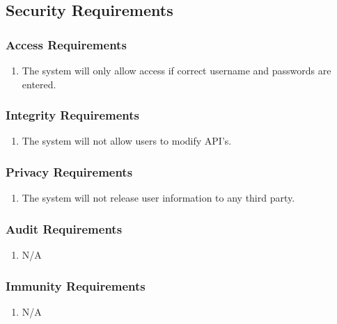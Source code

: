 \documentclass[]{article}
\begin{document}

\subsection{Security Requirements}
\label{sub:security_requirements}

\subsubsection{Access Requirements}
\label{ssub:access_requirements}
\begin{enumerate}[{SR}1. ]
  \item The system will only allow access if correct username and passwords are entered.
\end{enumerate}

\subsubsection{Integrity Requirements}
\label{ssub:integrity_requirements}
\begin{enumerate}[{SR}1. ]
  \item The system will not allow users to modify API's.
\end{enumerate}

\subsubsection{Privacy Requirements}
\label{ssub:privacy_requirements}
\begin{enumerate}[{SR}1. ]
  \item The system will not release user information to any third party.
\end{enumerate}

\subsubsection{Audit Requirements}
\label{ssub:audit_requirements}
\begin{enumerate}[{SR}1. ]
  \item N/A
\end{enumerate}

\subsubsection{Immunity Requirements}
\label{ssub:immunity_requirements}
\begin{enumerate}[{SR}1. ]
  \item N/A
\end{enumerate}
\end{document}
